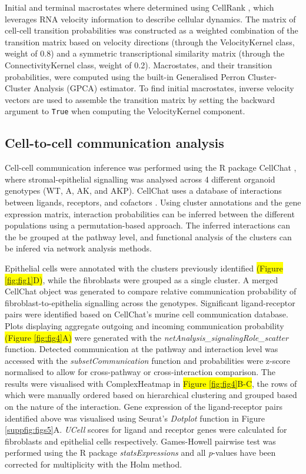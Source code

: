 Initial and terminal macrostates where determined using CellRank \cite{lange_cellrank_2022}, which leverages RNA velocity information to describe cellular dynamics. The matrix of cell-cell transition probabilities was constructed as a weighted combination of the transition matrix based on velocity directions (through the VelocityKernel class, weight of 0.8) and a symmetric transcriptional similarity matrix (through the ConnectivityKernel class, weight of 0.2). Macrostates, and their transition probabilities, were computed using the built-in Generalised Perron Cluster-Cluster Analysis (GPCA) estimator. To find initial macrostates, inverse velocity vectors are used to assemble the transition matrix by setting the backward argument to \texttt{True} when computing the VelocityKernel component. 

\subsection{Cell-to-cell communication analysis}

Cell-cell communication inference was performed using the R package CellChat \cite{jin_inference_2021}, where stromal-epithelial signalling was analysed across 4 different organoid genotypes (WT, A, AK, and AKP).
CellChat uses a database of interactions between ligands, receptors, and cofactors \cite{noauthor_cellchatdb_nodate}. Using cluster annotations and the gene expression matrix, interaction probabilities can be inferred between the different populations using a permutation-based approach. The inferred interactions can the be grouped at the pathway level, and functional analysis of the clusters can be infered via network analysis methods. 

Epithelial cells were annotated with the clusters previously identified \colorbox{yellow}{(Figure \ref{fig:fig1}D)}, while the fibroblasts were grouped as a single cluster. A merged CellChat object was generated to compare relative communication probability of fibroblast-to-epithelia signalling across the genotypes. Significant ligand-receptor pairs were identified based on CellChat's murine cell communication database. Plots displaying aggregate outgoing and incoming communication probability \colorbox{yellow}{(Figure \ref{fig:fig4}A)} were generated with the \textit{netAnalysis\_signalingRole\_scatter} function. Detected communication at the pathway and interaction level was accessed with the \textit{subsetCommunication} function and probabilities were z-score normalised to allow for cross-pathway or cross-interaction comparison. The results were visualised with ComplexHeatmap in \colorbox{yellow}{Figure \ref{fig:fig4}B-C}, the rows of which were manually ordered based on hierarchical clustering and grouped based on the nature of the interaction. Gene expression of the ligand-receptor pairs identified above was visualised using Seurat's \textit{Dotplot} function in Figure \ref{suppfig:figs5}A. \textit{UCell} scores for ligand and receptor genes were calculated for fibroblasts and epithelial cells respectively. Games-Howell pairwise test was performed using the R package \textit{statsExpressions} and all \textit{p}-values have been corrected for multiplicity with the Holm method.



